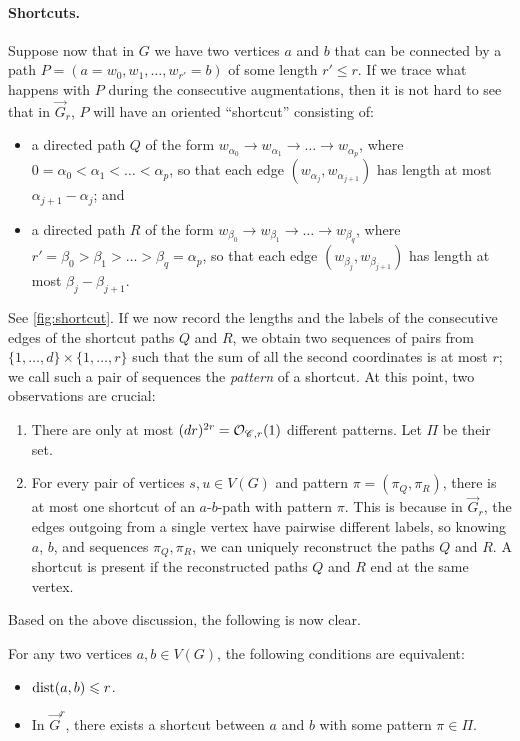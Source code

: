 \paragraph*{Shortcuts.}
Suppose now that in $G$ we have two vertices $a$ and $b$ that can be connected by a path $P=(a=w_0,w_1,\ldots,w_{r'}=b)$ of some length $r'\leq r$. If we trace what happens with $P$ during the consecutive augmentations, then it is not hard to see that in $\vec G_r$, $P$ will have an oriented ``shortcut'' consisting of:
\begin{itemize}
	\item a directed path $Q$ of the form $w_{\alpha_0}\to w_{\alpha_1}\to \ldots \to w_{\alpha_p}$, where $0=\alpha_0<\alpha_1<\ldots<\alpha_p$, so that each edge $(w_{\alpha_j},w_{\alpha_{j+1}})$ has length at most $\alpha_{j+1}-\alpha_j$; and
	\item a directed path $R$ of the form $w_{\beta_0}\to w_{\beta_1}\to \ldots \to w_{\beta_q}$, where $r'=\beta_0>\beta_1>\ldots>\beta_q=\alpha_p$, so that each edge $(w_{\beta_j},w_{\beta_{j+1}})$ has length at most $\beta_j-\beta_{j+1}$.
\end{itemize}
See \cref{fig:shortcut}. If we now record the lengths and the labels of the consecutive edges of the shortcut paths $Q$ and $R$, we obtain two sequences of pairs from $\{1,\ldots,d\}\times \{1,\ldots,r\}$ such that the sum of all the second coordinates is at most $r$; we call such a pair of sequences the \emph{pattern} of a shortcut. At this point, two observations are crucial:
\begin{enumerate}[label=(O\arabic*)]
	\item\label{o:numpat} There are only at most $(dr)^{2r}=\mathcal{O}_{\mathscr C,r}(1)$ different patterns. Let $\Pi$ be their set.
	\item\label{o:unique} For every pair of vertices $s,u\in V(G)$ and pattern $\pi=(\pi_Q,\pi_R)$, there is at most one shortcut of an $a$-$b$-path with pattern $\pi$. This is because in $\vec G_r$, the edges outgoing from a single vertex have pairwise different labels, so knowing $a$, $b$, and sequences $\pi_Q,\pi_R$, we can uniquely reconstruct the paths $Q$ and $R$. A shortcut is present if the reconstructed paths $Q$ and $R$ end at the same vertex.
\end{enumerate}
Based on the above discussion, the following is now clear.

\begin{claim}\label{cl:overview-shortcuts}
	For any two vertices $a,b\in V(G)$, the following conditions are equivalent:
	\begin{itemize}
		\item $\mathrm{dist}(a,b)\leqslant r$.
		\item In $\vec G^r$, there exists a shortcut between $a$ and $b$ with some pattern $\pi\in \Pi$.
	\end{itemize}
\end{claim}

